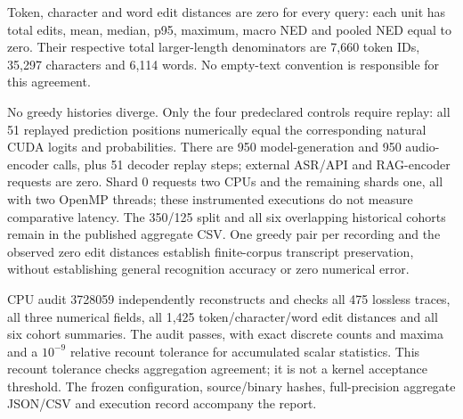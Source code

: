 Token, character and word edit distances are zero for every query: each unit has total edits, mean, median, p95, maximum, macro NED and pooled NED equal to zero. Their respective total larger-length denominators are 7,660 token IDs, 35,297 characters and 6,114 words. No empty-text convention is responsible for this agreement.

No greedy histories diverge. Only the four predeclared controls require replay: all 51 replayed prediction positions numerically equal the corresponding natural CUDA logits and probabilities. There are 950 model-generation and 950 audio-encoder calls, plus 51 decoder replay steps; external ASR/API and RAG-encoder requests are zero. Shard 0 requests two CPUs and the remaining shards one, all with two OpenMP threads; these instrumented executions do not measure comparative latency. The 350/125 split and all six overlapping historical cohorts remain in the published aggregate CSV. One greedy pair per recording and the observed zero edit distances establish finite-corpus transcript preservation, without establishing general recognition accuracy or zero numerical error.

CPU audit 3728059 independently reconstructs and checks all 475 lossless traces, all three numerical fields, all 1,425 token/character/word edit distances and all six cohort summaries. The audit passes, with exact discrete counts and maxima and a $10^{-9}$ relative recount tolerance for accumulated scalar statistics. This recount tolerance checks aggregation agreement; it is not a kernel acceptance threshold. The frozen configuration, source/binary hashes, full-precision aggregate JSON/CSV and execution record accompany the report.
